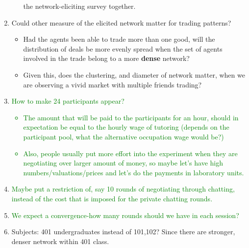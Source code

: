 \begin{enumerate}
\begin{itemize}
                the network-eliciting survey together.
        \end{itemize}
    \item Could other measure of the elicited network matter for trading
        patterns?
        \begin{itemize}
            \item Had the agents been able to trade more than one good, will the
                distribution of deals be more evenly spread when the set of
                agents involved in the trade belong to a more \textbf{dense}
                network?
            \item Given this, does the clustering, and diameter of network
                matter, when we are observing a vivid market with multiple
                friends trading?
        \end{itemize}
        \item \textcolor{green}{How to make 24 participants appear?
        \begin{itemize}
            \item The amount that will be paid to the participants for an hour, should in expectation be equal to the hourly wage of tutoring (depends on the participant pool, what the alternative occupation wage would be?)
            \item Also, people usually put more effort into the experiment when they are negotiating over larger amount of money, so maybe let's have high numbers/valuations/prices and let's do the payments in laboratory units.
        \end{itemize}}

        \item \textcolor{green}{Maybe put a restriction of, say 10 rounds of negotiating through chatting, instead of the cost that is imposed for the private chatting rounds.}

       \item \textcolor{green}{We expect a convergence-how many rounds should we have in each session?}

       \item Subjects: 401 undergraduates instead of 101,102? Since there are stronger, denser network within 401 class.

\end{enumerate}


